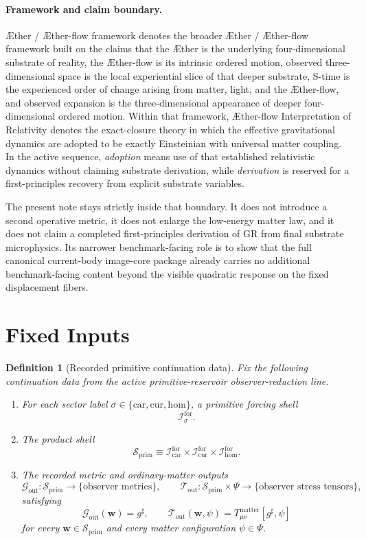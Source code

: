 \documentclass[11pt]{article}
\newcommand{\Aether}{\AE{}ther}
\newcommand{\Aflow}{\AE{}ther-flow}
\newcommand{\TheoryName}{\Aflow{} Interpretation of Relativity}
\newcommand{\TheoryProgram}{\Aether{} / \Aflow{} framework}
\newcommand{\CompletedMetric}{g^{\sharp}}
\newcommand{\MatterSpace}{\Psi}
\newcommand{\Car}{\mathrm{car}}
\newcommand{\Cur}{\mathrm{cur}}
\newcommand{\Hom}{\mathrm{hom}}
\newcommand{\ForSpace}[1]{\mathcal I_{#1}^{\mathrm{for}}}
\newcommand{\PrimShell}{\mathcal S_{\mathrm{prim}}}
\newcommand{\MetricOut}{\mathscr G_{\mathrm{out}}}
\newcommand{\MatterOut}{\mathscr T_{\mathrm{out}}}
\newtheorem{definition}{Definition}
\begin{document}
\paragraph{Framework and claim boundary.}
\TheoryProgram{} denotes the broader \Aether{} / \Aflow{} framework built on the claims that the \Aether{} is the underlying four-dimensional substrate of reality, the \Aflow{} is its intrinsic ordered motion, observed three-dimensional space is the local experiential slice of that deeper substrate, S-time is the experienced order of change arising from matter, light, and the \Aflow{}, and observed expansion is the three-dimensional appearance of deeper four-dimensional ordered motion. Within that framework, \TheoryName{} denotes the exact-closure theory in which the effective gravitational dynamics are adopted to be exactly Einsteinian with universal matter coupling. In the active sequence, \emph{adoption} means use of that established relativistic dynamics without claiming substrate derivation, while \emph{derivation} is reserved for a first-principles recovery from explicit substrate variables.

The present note stays strictly inside that boundary. It does not introduce a second operative metric, it does not enlarge the low-energy matter law, and it does not claim a completed first-principles derivation of GR from final substrate microphysics. Its narrower benchmark-facing role is to show that the full canonical current-body image-core package already carries no additional benchmark-facing content beyond the visible quadratic response on the fixed displacement fibers.

\section{Fixed Inputs}

\begin{definition}[Recorded primitive continuation data]
\label{def:fixed}
Fix the following continuation data from the active primitive-reservoir observer-reduction line.
\begin{enumerate}
    \item For each sector label \(\sigma\in\{\Car,\Cur,\Hom\}\), a primitive forcing shell
    \[
    \ForSpace{\sigma}.
    \]
    \item The product shell
    \[
    \PrimShell
    \equiv
    \ForSpace{\Car}\times \ForSpace{\Cur}\times \ForSpace{\Hom}.
    \]
    \item The recorded metric and ordinary-matter outputs
    \[
    \MetricOut:\PrimShell\to\{\text{observer metrics}\},
    \qquad
    \MatterOut:\PrimShell\times\MatterSpace\to\{\text{observer stress tensors}\},
    \]
    satisfying
    \begin{equation}
    \MetricOut(\mathbf w)=\CompletedMetric,
    \qquad
    \MatterOut(\mathbf w,\psi)
    =
    T_{\mu\nu}^{\mathrm{matter}}[\CompletedMetric,\psi]
    \label{eq:fixedoutputs}
    \end{equation}
    for every \(\mathbf w\in\PrimShell\) and every matter configuration \(\psi\in\MatterSpace\).
\end{enumerate}
\end{definition}
\end{document}
